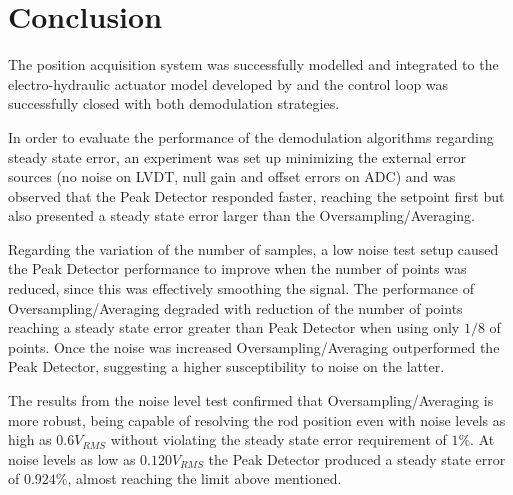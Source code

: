 \documentclass[conference]{IEEEtran}
\begin{document}




\section{Conclusion}
The position acquisition system was successfully modelled and integrated to the electro-hydraulic actuator model developed by \cite{Ballesteros} and the control loop was successfully closed with both demodulation strategies.

In order to evaluate the performance of the demodulation algorithms regarding steady state error, an experiment was set up minimizing the external error sources (no noise on LVDT, null gain and offset errors on ADC) and was observed that the Peak Detector responded faster, reaching the setpoint first but also presented a steady state error larger than the Oversampling/Averaging.

Regarding the variation of the number of samples, a low noise test setup caused the Peak Detector performance to improve when the number of points was reduced, since this was effectively smoothing the signal. The performance of Oversampling/Averaging degraded with reduction of the number of points reaching a steady state error greater than Peak Detector when using only $1/8$ of points. Once the noise was increased Oversampling/Averaging outperformed the Peak Detector, suggesting a higher susceptibility to noise on the latter.

The results from the noise level test confirmed that Oversampling/Averaging is more robust, being capable of resolving the rod position even with noise levels as high as $0.6V_{RMS}$ without violating the steady state error requirement of $1\%$. At noise levels as low as $0.120V_{RMS}$ the Peak Detector produced a steady state error of $0.924\%$, almost reaching the limit above mentioned.



\end{document}
